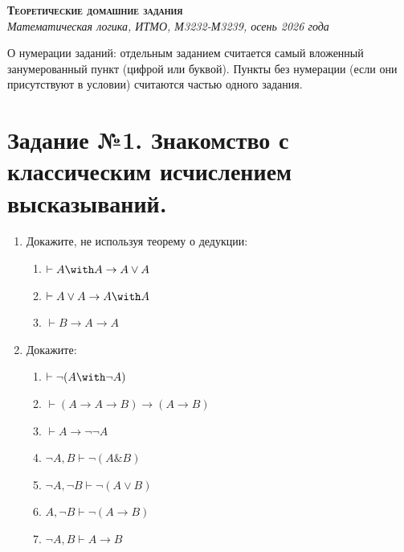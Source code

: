 \documentclass[10pt,a4paper,oneside]{article}
\begin{document}
\begin{center}{\Large\textsc{\textbf{Теоретические домашние задания}}}\\
             \it Математическая логика, ИТМО, М3232-М3239, осень 2026 года\end{center}

О нумерации заданий: отдельным заданием считается самый вложенный занумерованный пункт
(цифрой или буквой). Пункты без нумерации (если они присутствуют в условии) считаются 
частью одного задания.

\section*{Задание №1. Знакомство с классическим исчислением высказываний.}

\begin{enumerate}
\item Докажите, не используя теорему о дедукции:
\begin{enumerate}
\item $\vdash A \with A \rightarrow A \vee A$
\item $\vdash A \vee A \rightarrow A \with A$
\item $\vdash B \rightarrow A \rightarrow A$
\end{enumerate}

\item Докажите:
\begin{enumerate}
\item $\vdash \neg (A \with \neg A)$
\item $\vdash (A \rightarrow A \rightarrow B) \rightarrow (A \rightarrow B)$
\item $\vdash A \rightarrow \neg \neg A$
\item $\neg A, B \vdash \neg(A\& B)$
\item $\neg A,\neg B \vdash \neg( A\vee B)$
\item $ A,\neg B \vdash \neg( A\rightarrow B)$
\item $\neg A, B \vdash  A\rightarrow B$
\end{enumerate}


\end{enumerate}
\end{document}
